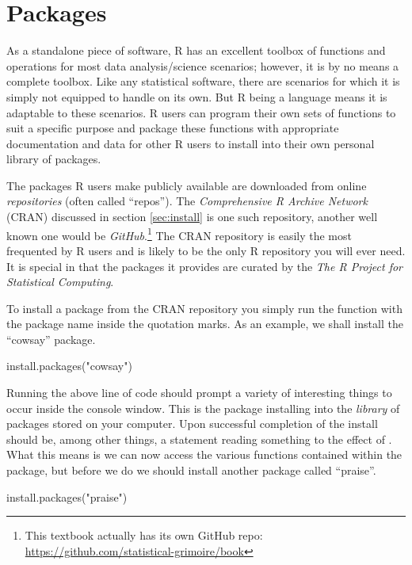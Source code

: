 \section{Packages}

As a standalone piece of software, R has an excellent toolbox of functions and operations for most data analysis/science scenarios; however, it is by no means a complete toolbox. Like any statistical software, there are scenarios for which it is simply not equipped to handle on its own.  But R being a language means it is adaptable to these scenarios.  R users can program their own sets of functions to suit a specific purpose and \gls{package} these functions with appropriate documentation and data for other R users to install into their own personal library of packages. 

The packages R users make publicly available are downloaded from online \textit{repositories} (often called ``repos'').  The \textit{Comprehensive R Archive Network} (CRAN) discussed in section \ref{sec:install} is one such repository, another well known one would be \textit{GitHub}.\footnote{This textbook actually has its own GitHub repo: \url{https://github.com/statistical-grimoire/book}}  The CRAN repository is easily the most frequented by R users and is likely to be the only R repository you will ever need. It is special in that the packages it provides are curated by the \textit{The R Project for Statistical Computing}.

To install a package from the CRAN repository you simply run the function  with the package name inside the quotation marks. As an example, we shall install the ``cowsay'' package.

\begin{inR}
install.packages("cowsay")
\end{inR}
\medskip

Running the above line of code should prompt a variety of interesting things to occur inside the console window. This is the package installing into the \textit{library} of packages stored on your computer. Upon successful completion of the install should be, among other things, a statement reading something to the effect of .  What this means is we can now access the various functions contained within the package, but before we do we should install another package called ``praise''.

\begin{inR}
install.packages("praise")
\end{inR}
\medskip

